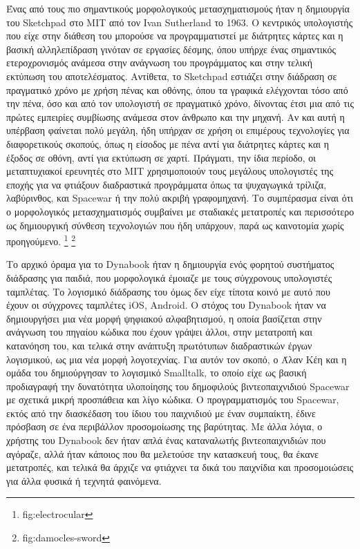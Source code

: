 \documentclass[
]{article}
\begin{document}
Ένας από τους πιο σημαντικούς μορφολογικούς μετασχηματισμούς ήταν η
δημιουργία του Sketchpad στο MIT από τον Ivan Sutherland το 1963. Ο
κεντρικός υπολογιστής που είχε στην διάθεση του μπορούσε να
προγραμματιστεί με διάτρητες κάρτες και η βασική αλληλεπίδραση γινόταν
σε εργασίες δέσμης, όπου υπήρχε ένας σημαντικός ετεροχρονισμός ανάμεσα
στην ανάγνωση του προγράμματος και στην τελική εκτύπωση του
αποτελέσματος. Αντίθετα, το Sketchpad εστιάζει στην διάδραση σε
πραγματικό χρόνο με χρήση πένας και οθόνης, όπου τα γραφικά ελέγχονται
τόσο από την πένα, όσο και από τον υπολογιστή σε πραγματικό χρόνο,
δίνοντας έτσι μια από τις πρώτες εμπειρίες συμβίωσης ανάμεσα στον
άνθρωπο και την μηχανή. Αν και αυτή η υπέρβαση φαίνεται πολύ μεγάλη, ήδη
υπήρχαν σε χρήση οι επιμέρους τεχνολογίες για διαφορετικούς σκοπούς,
όπως η είσοδος με πένα αντί για διάτρητες κάρτες και η έξοδος σε οθόνη,
αντί για εκτύπωση σε χαρτί. Πράγματι, την ίδια περίοδο, οι μεταπτυχιακοί
ερευνητές στο MIT χρησιμοποιούν τους μεγάλους υπολογιστές της εποχής για
να φτιάξουν διαδραστικά προγράμματα όπως τα ψυχαγωγικά τρίλιζα,
λαβύρινθος, και Spacewar ή την πολύ ακριβή γραφομηχανή. Το συμπέρασμα
είναι ότι ο μορφολογικός μετασχηματισμός συμβαίνει με σταδιακές
μετατροπές και περισσότερο ως δημιουργική σύνθεση τεχνολογιών που ήδη
υπάρχουν, παρά ως καινοτομία χωρίς προηγούμενο. \footnote{fig:electrocular}
\footnote{fig:damocles-sword}

Το αρχικό όραμα για το Dynabook ήταν η δημιουργία ενός φορητού
συστήματος διάδρασης για παιδιά, που μορφολογικά έμοιαζε με τους
σύγχρονους υπολογιστές ταμπλέτας. Το λογισμικό διάδρασης του όμως δεν
είχε τίποτα κοινό με αυτό που έχουν οι σύγχρονες ταμπλέτες iOS, Android.
Ο στόχος του Dynabook ήταν να δημιουργήσει μια νέα μορφή ψηφιακού
αλφαβητισμού, η οποία βασίζεται στην ανάγνωση του πηγαίου κώδικα που
έχουν γράψει άλλοι, στην μετατροπή και κατανόηση του, και τελικά στην
ανάπτυξη πρωτότυπων διαδραστικών έργων λογισμικού, ως μια νέα μορφή
λογοτεχνίας. Για αυτόν τον σκοπό, ο Άλαν Κέη και η ομάδα του
δημιούργησαν το λογισμικό Smalltalk, το οποίο είχε ως βασική προδιαγραφή
την δυνατότητα υλοποίησης του δημοφιλούς βιντεοπαιχνιδιού Spacewar με
σχετικά μικρή προσπάθεια και λίγο κώδικα. Ο προγραμματισμός του
Spacewar, εκτός από την διασκέδαση του ίδιου του παιχνιδιού με έναν
συμπαίκτη, έδινε πρόσβαση σε ένα περιβάλλον προσομοίωσης της βαρύτητας.
Με άλλα λόγια, ο χρήστης του Dynabook δεν ήταν απλά ένας καταναλωτής
βιντεοπαιχνιδιών που αγόραζε, αλλά ήταν κάποιος που θα μελετούσε την
κατασκευή τους, θα έκανε μετατροπές, και τελικά θα άρχιζε να φτιάχνει τα
δικά του παιχνίδια και προσομοιώσεις για άλλα φυσικά ή τεχνητά
φαινόμενα.
\end{document}
